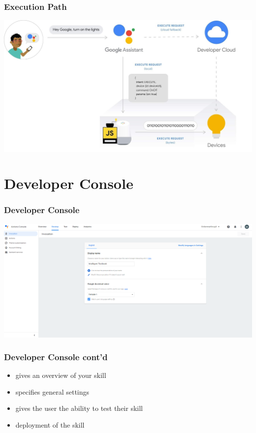 \documentclass{beamer}
\begin{document}
\begin{frame}
\frametitle{Execution Path}
\begin{center}
\includegraphics[scale=0.2]{pictures/execution-path.png}
\end{center}
\end{frame}


\section{Developer Console}

\begin{frame}
\frametitle{Developer Console}
\begin{center}
\includegraphics[scale=0.23]{pictures/developer-console.png}
\end{center}
\end{frame}

\begin{frame}
\frametitle{Developer Console cont'd}
\begin{center}
\begin{itemize}
\item gives an overview of your skill
\item specifies general settings
\item gives the user the ability to test their skill
\item deployment of the skill
\end{itemize}
\end{center}
\end{frame}
\end{document}

